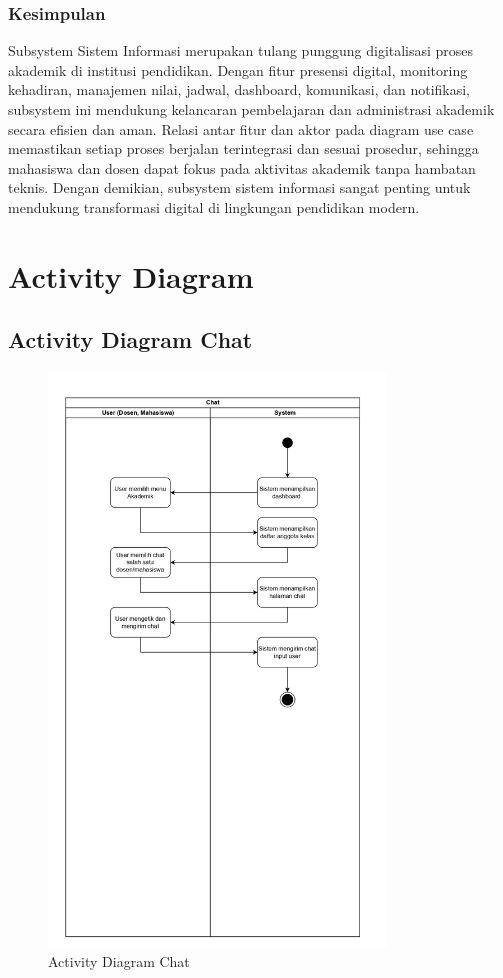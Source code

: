 \documentclass[a4paper,oneside,11pt]{book}
\begin{document}
\subsubsection{Kesimpulan}

Subsystem Sistem Informasi merupakan tulang punggung digitalisasi proses akademik di institusi pendidikan. Dengan fitur presensi digital, monitoring kehadiran, manajemen nilai, jadwal, dashboard, komunikasi, dan notifikasi, subsystem ini mendukung kelancaran pembelajaran dan administrasi akademik secara efisien dan aman. Relasi antar fitur dan aktor pada diagram use case memastikan setiap proses berjalan terintegrasi dan sesuai prosedur, sehingga mahasiswa dan dosen dapat fokus pada aktivitas akademik tanpa hambatan teknis. Dengan demikian, subsystem sistem informasi sangat penting untuk mendukung transformasi digital di lingkungan pendidikan modern.

\section{Activity Diagram}


\subsection{Activity Diagram Chat}
\begin{figure}[H]
  \centering
  \includegraphics[width=0.8\textwidth]{Activity Diagram/Chat.jpg}
  \caption{Activity Diagram Chat}
  \label{fig:activity_chat}
\end{figure}
\end{document}
